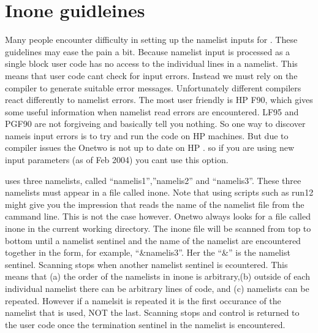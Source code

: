  \section{Inone guidleines}
 Many people encounter difficulty in setting up the namelist inputs
 for \ot. These guidelines  may ease the pain a bit. Because namelist
 input is processed as a single block user code has no access to the
 individual lines in a namelist. This means that user code cant check
 for input errors. Instead we must rely on the compiler to generate
 suitable error messages. Unfortunately different compilers react
 differently to  namelist errors. The most user friendly is HP F90, which gives some useful
     information when namelist read errors are encountered. LF95
     and PGF90 are not forgiveing and basically tell you nothing.
     So one way to discover nameis input errors is to try and run 
     the code on HP machines.
     But due to compiler issues the  Onetwo
     is not up to date on HP . so if you are using new input
     parameters (as of Feb 2004) you cant use this option.
     
 \ot uses three namelists, called ``namelis1'',''namelis2'' and ``namelis3''.
 These three namelists must appear in a file called inone. Note that
 using scripts such as run12 might give you the impression that \ot
 reads the name of the namelist file from the cammand line. This is
 not the case however. Onetwo always looks for a file called inone in
 the current working directory. The inone file will be scanned from
 top to bottom until a namelist sentinel and the name of the namelist
 are encountered together in the form, for example, ``&namelis3''.
 Her the ``&'' is the namelist sentinel. Scanning stops when another 
 namelist sentinel is ecountered. This means that (a) the order of the
 namelists in inone is arbitrary,(b) outside of each individual
 namelist there can be arbitrary lines of code, and (c) namelists can
 be repeated. However if a namelsit is repeated it is the first
 occurance of the namelist that is used, NOT the last. Scanning stops
 and control is returned to the user code once the termination
 sentinel in the namelist is encountered.

